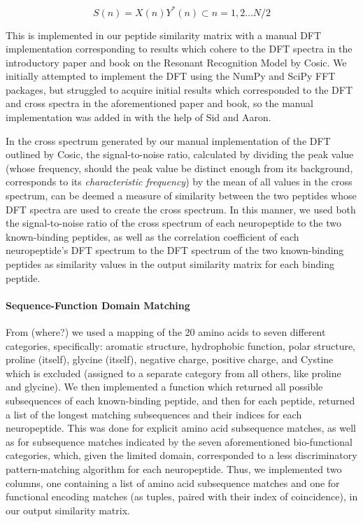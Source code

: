 \documentclass[]{article}
\let\oldparagraph\paragraph
\renewcommand{\paragraph}[1]{\oldparagraph{#1}\mbox{}}
\begin{document}
\begin{equation}
    S(n) = X(n)Y^*(n) \subset n = 1,2 \dots N/2
\end{equation}

This is implemented in our peptide similarity matrix with a manual DFT implementation corresponding to results which cohere to the DFT spectra in the introductory paper and book on the Resonant Recognition Model by Cosic. We initially attempted to implement the DFT using the NumPy and SciPy FFT packages, but struggled to acquire initial results which corresponded to the DFT and cross spectra in the aforementioned paper and book, so the manual implementation was added in with the help of Sid and Aaron.

In the cross spectrum generated by our manual implementation of the DFT outlined by Cosic, the signal-to-noise ratio, calculated by dividing the peak value (whose frequency, should the peak value be distinct enough from its background, corresponds to its \textit{characteristic frequency}) by the mean of all values in the cross spectrum, can be deemed a measure of similarity between the two peptides whose DFT spectra are used to create the cross spectrum. In this manner, we used both the signal-to-noise ratio of the cross spectrum of each neuropeptide to the two known-binding peptides, as well as the correlation coefficient of each neuropeptide's DFT spectrum to the DFT spectrum of the two known-binding peptides as similarity values in the output similarity matrix for each binding peptide.

\hypertarget{domainmatching}{%
\paragraph{Sequence-Function Domain Matching}\label{domainmatching}}

From (where?) we used a mapping of the 20 amino acids to seven different categories, specifically: aromatic structure, hydrophobic function, polar structure, proline (itself), glycine (itself), negative charge, positive charge, and Cystine which is excluded (assigned to a separate category from all others, like proline and glycine). We then implemented a function which returned all possible subsequences of each known-binding peptide, and then for each peptide, returned a list of the longest matching subsequences and their indices for each neuropeptide. This was done for explicit amino acid subsequence matches, as well as for subsequence matches indicated by the seven aforementioned bio-functional categories, which, given the limited domain, corresponded to a less discriminatory pattern-matching algorithm for each neuropeptide. Thus, we implemented two columns, one containing a list of amino acid subsequence matches and one for functional encoding matches (as tuples, paired with their index of coincidence), in our output similarity matrix.
\end{document}
